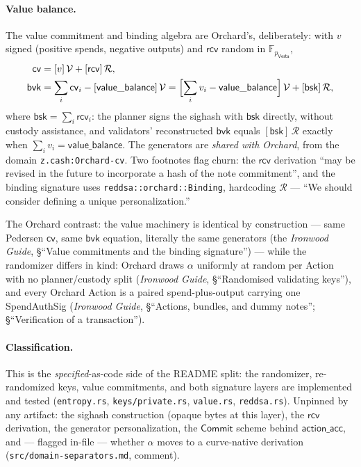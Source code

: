 \documentclass[11pt,a4paper]{article}
\theoremstyle{definition}
\newcommand{\F}{\mathbb{F}}
\newcommand{\Comm}{\mathsf{Commit}}
\newcommand{\cvsym}{\mathsf{cv}}
\newcommand{\Vesta}{\ensuremath{\mathsf{Vesta}}}
\newcommand{\rcv}{\ensuremath{\mathsf{rcv}}}
\begin{document}
\paragraph{Value balance.} The value commitment and binding algebra are
Orchard's, deliberately: with $v$ signed (positive spends, negative
outputs) and $\rcv$ random in $\F_{p_{\Vesta}}$,
\begin{align*}
\cvsym &= [v]\,\mathcal{V} + [\rcv]\,\mathcal{R}, \\
\mathsf{bvk} &= \sum_i \cvsym_i - [\mathsf{value\_balance}]\,\mathcal{V}
 = \Bigl[\sum_i v_i - \mathsf{value\_balance}\Bigr]\,\mathcal{V}
   + [\mathsf{bsk}]\,\mathcal{R},
\end{align*}
where $\mathsf{bsk} = \sum_i \rcv_i$: the planner signs the sighash with
$\mathsf{bsk}$ directly, without custody assistance, and validators'
reconstructed $\mathsf{bvk}$ equals $[\mathsf{bsk}]\,\mathcal{R}$ exactly
when $\sum_i v_i = \mathsf{value\_balance}$. The generators are
\emph{shared with Orchard}, from the domain \texttt{z.cash:Orchard-cv}.
Two footnotes flag churn: the $\rcv$ derivation ``may be revised in the
future to incorporate a hash of the note commitment'', and the binding
signature uses \texttt{reddsa::orchard::Binding}, hardcoding $\mathcal{R}$
--- ``We should consider defining a unique personalization.''

The Orchard contrast: the value machinery is identical by construction ---
same Pedersen $\cvsym$, same $\mathsf{bvk}$ equation, literally the same
generators (the \emph{Ironwood Guide}, \S``Value commitments and the binding
signature'') --- while the randomizer differs
in kind: Orchard draws $\alpha$ uniformly at random per Action with no
planner/custody split (\emph{Ironwood Guide}, \S``Randomised validating
keys''), and every Orchard Action is a paired
spend-plus-output carrying one \textsf{SpendAuthSig} (\emph{Ironwood
Guide}, \S``Actions, bundles, and dummy notes''; \S``Verification of a
transaction'').

\paragraph{Classification.} This is the \emph{specified}-as-code side of
the README split: the randomizer, re-randomized keys, value commitments,
and both signature layers are implemented and tested (\texttt{entropy.rs},
\texttt{keys/private.rs}, \texttt{value.rs}, \texttt{reddsa.rs}). Unpinned
by any artifact: the sighash construction (opaque bytes at this layer),
the $\rcv$ derivation, the generator personalization, the $\Comm$ scheme
behind $\mathsf{action\_acc}$, and --- flagged in-file --- whether
$\alpha$ moves to a curve-native derivation
(\texttt{src/domain-separators.md}, comment).
\end{document}

